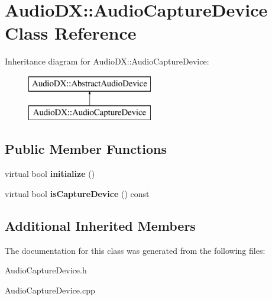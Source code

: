 \hypertarget{class_audio_d_x_1_1_audio_capture_device}{\section{Audio\-D\-X\-:\-:Audio\-Capture\-Device Class Reference}
\label{class_audio_d_x_1_1_audio_capture_device}
}
Inheritance diagram for Audio\-D\-X\-:\-:Audio\-Capture\-Device\-:\begin{figure}[H]
\begin{center}
\leavevmode
\includegraphics[height=2.000000cm]{class_audio_d_x_1_1_audio_capture_device}
\end{center}
\end{figure}
\subsection*{Public Member Functions}
\begin{DoxyCompactItemize}
\item 
\hypertarget{class_audio_d_x_1_1_audio_capture_device_ac250657c952e2d6b444f02437f1794e7}{virtual bool {\bfseries initialize} ()}\label{class_audio_d_x_1_1_audio_capture_device_ac250657c952e2d6b444f02437f1794e7}

\item 
\hypertarget{class_audio_d_x_1_1_audio_capture_device_af103510b605a3f09f45c9168a8314c2a}{virtual bool {\bfseries is\-Capture\-Device} () const }\label{class_audio_d_x_1_1_audio_capture_device_af103510b605a3f09f45c9168a8314c2a}

\end{DoxyCompactItemize}
\subsection*{Additional Inherited Members}


The documentation for this class was generated from the following files\-:\begin{DoxyCompactItemize}
\item 
Audio\-Capture\-Device.\-h\item 
Audio\-Capture\-Device.\-cpp\end{DoxyCompactItemize}

